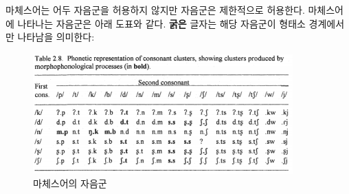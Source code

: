 마체스어는 어두 자음군을 허용하지 않지만 자음군은 제한적으로 허용한다. 마체스어에 나타나는 자음군은 아래 도표와 같다. \textbf{굵은} 글자는 해당 자음군이 형태소 경계에서만 나타남을 의미한다: 

\begin{figure}
	\centering
		\includegraphics[width=100mm]{Matses/src/matses4.png}
		\caption{마체스어의 자음군}
\end{figure}